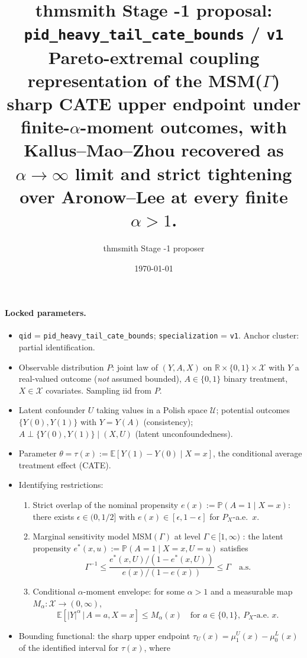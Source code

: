 \documentclass[11pt]{article}
\title{thmsmith Stage -1 proposal: \texttt{pid\_heavy\_tail\_cate\_bounds} / \texttt{v1}%
  \\ \large Pareto-extremal coupling representation of the MSM($\Gamma$) sharp CATE upper endpoint under finite-$\alpha$-moment outcomes, with Kallus--Mao--Zhou recovered as $\alpha\to\infty$ limit and strict tightening over Aronow--Lee at every finite $\alpha>1$.}
\author{thmsmith Stage -1 proposer}
\date{\today}
\newcommand{\E}{\mathbb{E}}
\renewcommand{\Pr}{\mathbb{P}}
\newcommand{\R}{\mathbb{R}}
\theoremstyle{definition}
\theoremstyle{plain}
\theoremstyle{remark}
\begin{document}
\maketitle


\paragraph{Locked parameters.}
\begin{itemize}[leftmargin=*]
  \item \texttt{qid} = \texttt{pid\_heavy\_tail\_cate\_bounds}; \texttt{specialization} = \texttt{v1}. Anchor cluster: partial identification.
  \item Observable distribution $P$: joint law of $(Y, A, X)$ on $\R \times \{0,1\} \times \mathcal{X}$ with $Y$ a real-valued outcome (\emph{not} assumed bounded), $A \in \{0,1\}$ binary treatment, $X \in \mathcal{X}$ covariates. Sampling iid from $P$.
  \item Latent confounder $U$ taking values in a Polish space $\mathcal{U}$; potential outcomes $\{Y(0), Y(1)\}$ with $Y = Y(A)$ (consistency); $A \perp \{Y(0), Y(1)\} \mid (X, U)$ (latent unconfoundedness).
  \item Parameter $\theta = \tau(x) := \E[Y(1) - Y(0) \mid X = x]$, the conditional average treatment effect (CATE).
  \item Identifying restrictions:
    \begin{enumerate}[label=(R\arabic*)]
      \item Strict overlap of the nominal propensity $e(x) := \Pr(A=1 \mid X=x)$: there exists $\epsilon \in (0, 1/2]$ with $e(x) \in [\epsilon, 1-\epsilon]$ for $P_X$-a.e.\ $x$.
      \item Marginal sensitivity model MSM$(\Gamma)$ at level $\Gamma \in [1, \infty)$ \citep{Tan2006,KallusMaoZhou2019,YadlowskyNamkoongBasuDuchiTian2022}: the latent propensity $e^*(x, u) := \Pr(A=1 \mid X=x, U=u)$ satisfies
        \[ \Gamma^{-1} \le \frac{e^*(x, U)/(1 - e^*(x, U))}{e(x)/(1 - e(x))} \le \Gamma \quad \text{a.s.} \]
      \item Conditional $\alpha$-moment envelope: for some $\alpha > 1$ and a measurable map $M_\alpha : \mathcal{X} \to (0, \infty)$,
        \[ \E\!\left[ |Y|^\alpha \,\big|\, A = a, X = x \right] \le M_\alpha(x) \quad \text{for } a \in \{0,1\},\ P_X\text{-a.e.\ } x. \]
    \end{enumerate}
  \item Bounding functional: the sharp upper endpoint $\tau_U(x) = \mu_1^U(x) - \mu_0^L(x)$ of the identified interval for $\tau(x)$, where

\end{itemize}
\end{document}
